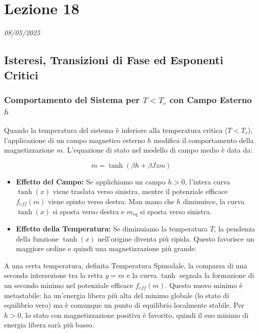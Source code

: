 \chapter{Lezione 18}
\label{capitolo_18}
\textit{08/05/2025}

\section{Isteresi, Transizioni di Fase ed Esponenti Critici}

\subsection*{Comportamento del Sistema per $T < T_c$ con Campo Esterno $h$}
Quando la temperatura del sistema è inferiore alla temperatura critica ($T < T_c$), l'applicazione di un campo magnetico esterno $h$ modifica il comportamento della magnetizzazione $m$.
L'equazione di stato nel modello di campo medio è data da:

\begin{equation} \label{eq:ch18_1}
m = \tanh(\beta h + \beta J z m)
\end{equation}

\begin{itemize}
    \item \textbf{Effetto del Campo:} Se applichiamo un campo $h > 0$, l'intera curva $\tanh(x)$ viene traslata verso sinistra, mentre il potenziale efficace $f_{eff}(m)$ viene spinto verso destra.
Man mano che $h$ diminuisce, la curva $\tanh(x)$ si sposta verso destra e $m_{eq}$ si sposta verso sinistra.
    \item \textbf{Effetto della Temperatura:} Se diminuiamo la temperatura $T$, la pendenza della funzione $\tanh(x)$ nell'origine diventa più ripida. Questo favorisce un maggiore ordine e quindi una magnetizzazione più grande.
\end{itemize}

A una certa temperatura, definita Temperatura Spinodale, la comparsa di una seconda intersezione tra la retta $y=m$ e la curva $\tanh$ segnala la formazione di un secondo minimo nel potenziale efficace $f_{eff}(m)$.
Questo nuovo minimo è metastabile: ha un'energia libera più alta del minimo globale (lo stato di equilibrio vero) ma è comunque un punto di equilibrio localmente stabile. Per $h > 0$, lo stato con magnetizzazione positiva è favorito, quindi il suo minimo di energia libera sarà più basso.


